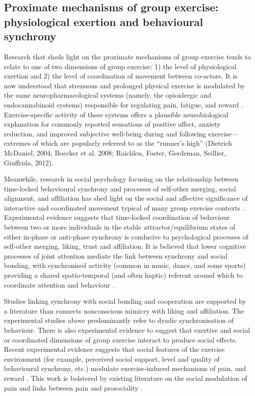 \subsection{Proximate mechanisms of group exercise: physiological exertion and behavioural synchrony}
Research that sheds light on the proximate mechanisms of group exercise tends to relate to one of two dimensions of group exercise: 1) the level of physiological exertion and 2) the level of coordination of movement between co-actors.  It is now understood that strenuous and prolonged physical exercise is modulated by the same neuropharmacological systems (namely, the opioidergic and endocannabinoid systems) responsible for regulating pain, fatigue, and reward \citep{Boecker2008,Raichlen2013}.  Exercise-specific activity of these systems offers a plausible neurobiological explanation for commonly reported sensations of positive affect, anxiety reduction, and improved subjective well-being during and following exercise---extremes of which are popularly referred to as the ``runner's high'' (Dietrich  McDaniel, 2004; Boecker et al. 2008; Raichlen, Foster, Gerdeman, Seillier,  Giuffrida, 2012).

Meanwhile, research in social psychology focusing on the relationship between time-locked behavioural synchrony and processes of self-other merging, social alignment, and affiliation has shed light on the social and affective significance of interactive and coordinated movement typical of many group exercise contexts \cite{Wiltermuth2009,Kirschner2010,Reddish2013,Tuncgenc2016}. Experimental evidence suggests that time-locked coordination of behaviour between two or more individuals in the stable attractor/equilibrium states of either in-phase or anti-phase synchrony is conducive to psychological processes of self-other merging, liking, trust and affiliation.  It is believed that lower cognitive processes of joint attention mediate the link between synchrony and social bonding, with synchronised activity (common in music, dance, and some sports) providing a shared spatio-temporal (and often haptic) referent around which to coordinate attention and behaviour \cite{Launay2016,Wolf2015}.

Studies linking synchrony with social bonding and cooperation are supported by a literature than connects nonconscious mimicry with liking and affiliation\citep{VanBaaren2009}.  The experimental studies above predominantly refer to dyadic synchronisation of behaviour.   There is also experimental evidence to suggest that exertive and social or coordinated dimensions of group exercise interact to produce social effects.  Recent experimental evidence suggests that social features of the exercise environment (for example, perceived social support, level and quality of behavioural synchrony, etc.) modulate exercise-induced mechanisms of pain, and reward \citep{Cohen2009,Sullivan2014,Tarr2015,Davis2015,Weinstein2016}. This work is bolstered by existing literature on the social modulation of pain \citep{Eisenberger2012a} and links between pain and prosociality \citep{Bastian2014a}.

